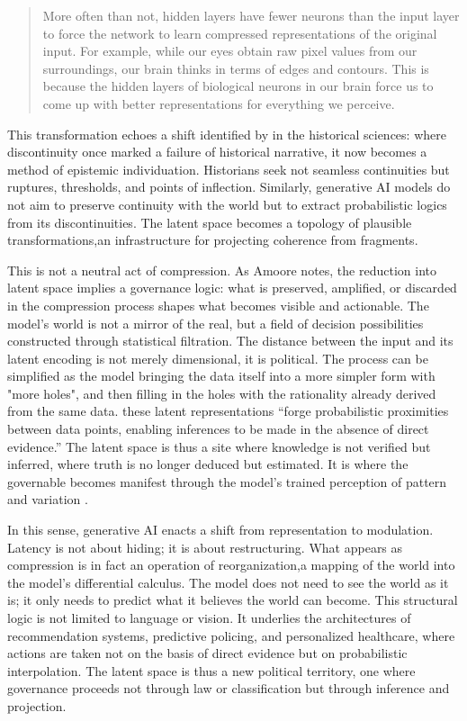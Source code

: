 \begin{quote}
	More often than not, hidden layers have fewer neurons than the input layer to
	force the network to learn compressed representations of the original input.
	For example, while our eyes obtain raw pixel values from our surroundings,
	our brain thinks in terms of edges and contours. This is because the hidden
	layers of biological neurons in our brain force us to come up with better
	representations for everything we perceive. \parencite{buduma2022}
\end{quote}

This transformation echoes a shift identified by \textcite[7--9]{foucault2012a} in the historical sciences: where discontinuity once marked a failure of historical narrative, it now becomes a method of epistemic individuation. Historians seek not seamless continuities but ruptures, thresholds, and points of inflection. Similarly, generative AI models do not aim to preserve continuity with the world but to extract probabilistic logics from its discontinuities. The latent space becomes a topology of plausible transformations,an infrastructure for projecting coherence from fragments.

This is not a neutral act of compression. As Amoore notes, the reduction into latent space implies a governance logic: what is preserved, amplified, or discarded in the compression process shapes what becomes visible and actionable. The model’s world is not a mirror of the real, but a field of decision possibilities constructed through statistical filtration. The distance between the input and its latent encoding is not merely dimensional, it is political. The process can be simplified as the model bringing the data itself into a more simpler form with "more holes", and then filling in the holes with the rationality already derived from the same data. these latent representations “forge probabilistic proximities between data points, enabling inferences to be made in the absence of direct evidence.” The latent space is thus a site where knowledge is not verified but inferred, where truth is no longer deduced but estimated. It is where the governable becomes manifest through the model’s trained perception of pattern and variation \parencite[5]{amoore2024}.

In this sense, generative AI enacts a shift from representation to modulation. Latency is not about hiding; it is about restructuring. What appears as compression is in fact an operation of reorganization,a mapping of the world into the model’s differential calculus. The model does not need to see the world as it is; it only needs to predict what it believes the world can become. This structural logic is not limited to language or vision. It underlies the architectures of recommendation systems, predictive policing, and personalized healthcare, where actions are taken not on the basis of direct evidence but on probabilistic interpolation. The latent space is thus a new political territory, one where governance proceeds not through law or classification but through inference and projection.

